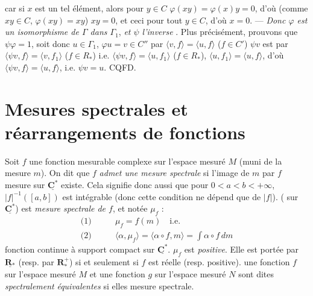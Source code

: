 \documentclass[11pt,a4paper]{article}
\begin{document}
car si $x$ est un tel élément, alors pour $y \in C$  $\varphi(xy) = \varphi(x)y = 0$, d'où (comme $xy \in C$,  $\varphi(xy) = xy$) $xy = 0$, et ceci pour tout $y \in C$, d'où $x = 0$. --- \emph{Donc $\varphi$ est un isomorphisme de $\Gamma$ dans $\Gamma_1$}, \struck{\ill{}} \emph{et $\psi$ l'inverse} . \ill{} Plus précisément, prouvons que $\psi\varphi = 1$, soit donc $u \in \Gamma_1$, $\varphi u = v \in C''$   par $\langle v, f\rangle = \langle u, f\rangle$ ($f \in C'$)  $\psi v$ est  par $\langle \psi v, f\rangle = \langle v, f_1\rangle$ ($f \in R_{*}$) i.e. $\langle \psi v, f\rangle = \langle u, f_1\rangle$ ($f \in R_{*}$),   $\langle u, f_1\rangle = \langle u, f\rangle$, d'où $\langle \psi v, f\rangle = \langle u, f\rangle$, i.e. $\psi v = u$. CQFD.

\section{Mesures spectrales et réarrangements de fonctions}



Soit $f$ une fonction mesurable complexe sur l'espace mesuré $M$ (muni de la mesure $m$). On dit que $f$ \emph{admet une mesure spectrale} si l'image de $m$ par $f$   mesure sur $\underline{\mathbf{C}^{*}}$ existe. Cela signifie donc aussi que pour $0 < a < b < +\infty$, $|f|^{-1}([a,b])$ est intégrable (donc cette condition ne dépend que de $|f|$).  (   sur $\underline{\mathbf{C}^{*}}$) est  \emph{mesure spectrale de $f$}, et notée $\mu_f$ :
\begin{align*}
  \text{(1)}\qquad & \mu_f = f(m) \quad\text{i.e.} \\
  \text{(2)}\qquad & \langle \alpha, \mu_f\rangle = \langle \alpha\circ f, m\rangle = \int \alpha\circ f\, dm
\end{align*}
  \struck{\ill{}} fonction continue à support compact sur $\underline{\mathbf{C}^{*}}$. $\mu_f$ est \emph{positive}. Elle est portée par $\underline{\mathbf{R}_{*}}$ (resp. par $\mathbf{R}^{+}_{*}$) si et seulement si $f$ est réelle (resp. positive). \ill{} une fonction $f$ sur l'espace mesuré $M$ et une fonction $g$ sur l'espace mesuré $N$ sont dites \emph{spectralement} \emph{équivalentes} si elles   mesure spectrale.
\end{document}
